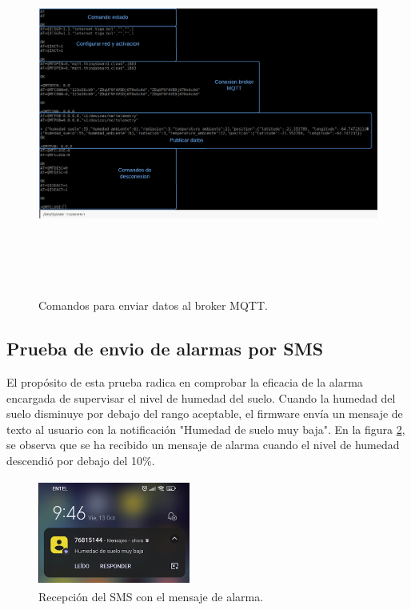 \begin{figure}[h]
  \centering
    \includegraphics[width=\linewidth, height=12cm]{./Figures/secuencia de comandos shell.png}
  \caption{Comandos para enviar datos al broker MQTT.}
    \label{fig:secuencia de comandos shell}
\end{figure}

\subsection{Prueba de envio de alarmas por SMS}
El propósito de esta prueba radica en comprobar la eficacia de la alarma encargada de supervisar el nivel de humedad del suelo. Cuando la humedad del suelo disminuye por debajo del rango aceptable, el firmware envía un mensaje de texto al usuario con la notificación "Humedad de suelo muy baja". En la figura \ref{fig:sms alarma}, se observa que se ha recibido un mensaje de alarma cuando el nivel de humedad descendió por debajo del 10\%.

\begin{figure}[h!]
  \centering
    \includegraphics[width=5cm, height=3.5cm]{./Figures/sms_alarma2.png}
  \caption{Recepción del SMS con el mensaje  de alarma.}
    \label{fig:sms alarma}
\end{figure}

\label{sec:pruebasHW}

